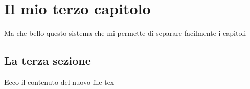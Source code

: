 \chapter{Il mio terzo capitolo}
Ma che bello questo sistema che mi permette di separare facilmente i capitoli
\section{La terza sezione}
Ecco il contenuto del nuovo file tex